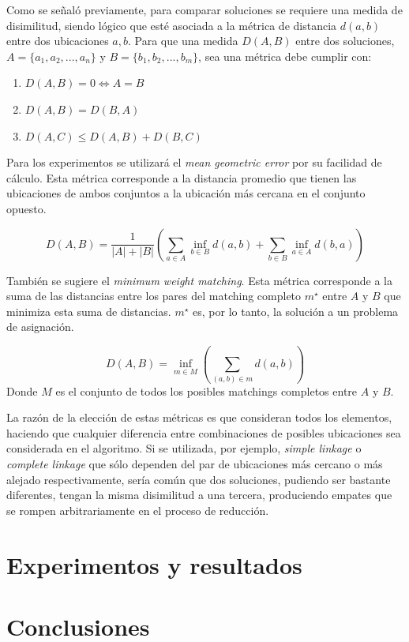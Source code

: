 \documentclass{article}
\begin{document}
Como se señaló previamente, para comparar soluciones se requiere una medida de disimilitud, siendo lógico que esté asociada a la métrica de distancia $d(a,b)$ entre dos ubicaciones $a,b$. Para que una medida $D(A,B)$ entre dos soluciones, $A = \{a_1,a_2,...,a_n\}$ y $B = \{b_1,b_2,...,b_m\}$, sea una métrica debe cumplir con:

\begin{enumerate}
\item $D(A,B) = 0 \Leftrightarrow A=B$
\item $D(A,B) = D(B,A)$
\item $D(A,C) \leq D(A,B) + D(B,C)$
\end{enumerate}

Para los experimentos se utilizará el \emph{mean geometric error} por su facilidad de cálculo. Esta métrica corresponde a la distancia promedio que tienen las ubicaciones de ambos conjuntos a la ubicación más cercana en el conjunto opuesto.

\begin{equation}
D(A,B) = \frac{1}{|A|+|B|}\left(\sum_{a \in A}\inf_{b \in B}d(a,b) +
\sum_{b \in B}\inf_{a \in A}d(b,a)\right)
\end{equation}

También se sugiere el \emph{minimum weight matching}. Esta métrica corresponde a la suma de las distancias entre los pares del matching completo $m^\star$ entre $A$ y $B$ que minimiza esta suma de distancias. $m^\star$ es, por lo tanto, la solución a un problema de asignación.

\begin{equation}
D(A,B) = \inf_{m \in M}\left( \sum_{(a,b) \in m} d(a,b)\right)
\end{equation}
Donde $M$ es el conjunto de todos los posibles matchings completos entre $A$ y $B$.

La razón de la elección de estas métricas es que consideran todos los elementos, haciendo que cualquier diferencia entre combinaciones de posibles ubicaciones sea considerada en el algoritmo. Si se utilizada, por ejemplo, \emph{simple linkage} o \emph{complete linkage} que sólo dependen del par de ubicaciones más cercano o más alejado respectivamente, sería común que dos soluciones, pudiendo ser bastante diferentes, tengan la misma disimilitud a una tercera, produciendo empates que se rompen arbitrariamente en el proceso de reducción.

\section{Experimentos y resultados}

\section{Conclusiones}


{}
\end{document}
